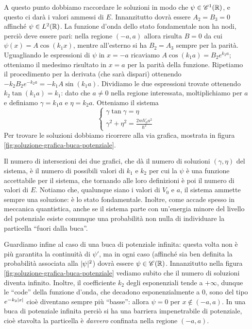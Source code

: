 A questo punto dobbiamo raccordare le soluzioni in modo che $\psi\in\cont[1]{\R}$, e questo ci darà i valori ammessi di $E$.
Innanzitutto dovrà essere $A_2=B_3=0$ affinch\'e $\psi\in \leb[2]{\R}$.
La funzione d'onda dello stato fondamentale non ha nodi, perciò deve essere pari: nella regione $(-a,a)$ allora risulta $B=0$ da cui $\psi(x)=A\cos(k_1x)$, mentre all'esterno si ha $B_2=A_3$ sempre per la parità.
Uguagliando le espressioni di $\psi$ in $x=-a$ ricaviamo $A\cos(k_1a)=B_2e^{k_2a}$; otteniamo il medesimo risultato in $x=a$ per la parità della funzione.
Ripetiamo il procedimento per la derivata (che sarà dispari) ottenendo $-k_2B_2e^{-k_2a}=-k_1A\sin(k_1a)$.
Dividiamo le due espressioni trovate ottenendo $k_2\tan(k_1a)=k_1$: dato che $a\ne 0$ nella regione interessata, moltiplichiamo per $a$ e definiamo $\gamma=k_1a$ e $\eta=k_2a$.
Otteniamo il sistema
\begin{equation}
	\begin{cases}
		\gamma\tan\gamma=\eta\\
		\gamma^2+\eta^2=\frac{2mV_0a^2}{\hbar^2}
	\end{cases}
	\label{eq:sistema-soluzioni-buca-potenziale-finita}
\end{equation}
Per trovare le soluzioni dobbiamo ricorrere alla via grafica, mostrata in figura \ref{fig:soluzione-grafica-buca-potenziale}.

Il numero di intersezioni dei due grafici, che dà il numero di soluzioni $(\gamma,\eta)$ del sistema, è il numero di possibili valori di $k_1$ e $k_2$ per cui la $\psi$ è una funzione accettabile per il sistema, che tornando alle loro definizioni è poi il numero di valori di $E$.
Notiamo che, qualunque siano i valori di $V_0$ e $a$, il sistema ammette sempre una soluzione: è lo stato fondamentale.
Inoltre, come accade spesso in meccanica quantistica, anche se il sistema parte con un'energia minore del livello del potenziale esiste comunque una probabilità non nulla di individuare la particella ``fuori dalla buca''.

Guardiamo infine al caso di una buca di potenziale infinita: questa volta non è più garantita la continuità di $\psi'$, ma in ogni caso (affinch\'e sia ben definita la probabilità associata alla $\abs{\psi}^2$) dovrà essere $\psi\in\cont{\R}$.
Innanzitutto nella figura \ref{fig:soluzione-grafica-buca-potenziale} vediamo subito che il numero di soluzioni diventa infinito.
Inoltre, il coefficiente $k_2$ degli esponenziali tende a $+\infty$, dunque le ``code'' della funzione d'onda, che decadono esponenzialmente a 0, sono del tipo $e^{-k_2\abs{x}}$ cioè diventano sempre più ``basse'': allora $\psi=0$ per $x\notin(-a,a)$.
In una buca di potenziale infinita perciò si ha una barriera impenetrabile di potenziale, cioè stavolta la particella è \emph{davvero} confinata nella regione $(-a,a)$.


